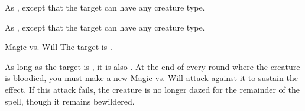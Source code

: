 \begin{spellheader}
    \spellrng{\rngclose}
\end{spellheader}
\begin{spelleffects}
    \spellsuccess As , except that the target can have any creature type.
\end{spelleffects}
\begin{spellfooter}

\end{spellfooter}

\begin{spellheader}
\end{spellheader}
\begin{spelleffects}
    \spellsuccess As , except that the target can have any creature type.
\end{spelleffects}
\begin{spellfooter}

\end{spellfooter}

\begin{spellheader}
    \spellrng{\rngclose}
\end{spellheader}
\begin{spelleffects}
    \begin{spellattack}{Magic vs. Will}
        \spellsuccess The target is \bewildered.

        As long as the target is \bloodied, it is also \dazed. At the end of every round where the creature is bloodied, you must make a new Magic vs. Will attack against it to sustain the effect. If this attack fails, the creature is no longer dazed for the remainder of the spell, though it remains bewildered.
    \end{spellattack}
\end{spelleffects}
\begin{spellfooter}

\end{spellfooter}

